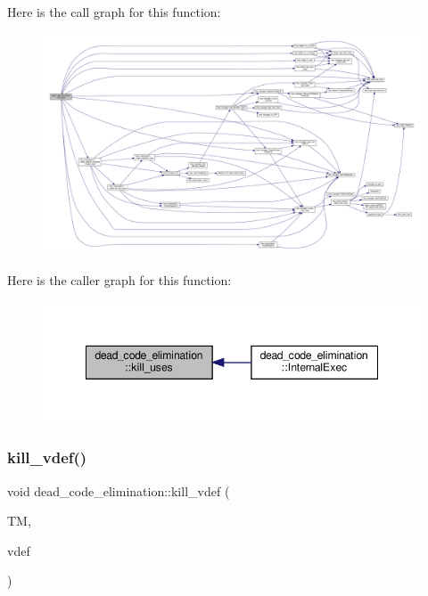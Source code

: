 Here is the call graph for this function\+:
\nopagebreak
\begin{figure}[H]
\begin{center}
\leavevmode
\includegraphics[width=350pt]{d5/d8b/classdead__code__elimination_af489c33b5908e6b2a9cb967022ee37da_cgraph}
\end{center}
\end{figure}
Here is the caller graph for this function\+:
\nopagebreak
\begin{figure}[H]
\begin{center}
\leavevmode
\includegraphics[width=348pt]{d5/d8b/classdead__code__elimination_af489c33b5908e6b2a9cb967022ee37da_icgraph}
\end{center}
\end{figure}
\mbox{\label{classdead__code__elimination_acf7b0a14bfd3b75d84f97fbb303736df}} 
\subsubsection{\texorpdfstring{kill\+\_\+vdef()}{kill\_vdef()}}
{\footnotesize\ttfamily void dead\+\_\+code\+\_\+elimination\+::kill\+\_\+vdef (\begin{DoxyParamCaption}\item[{const \hyperlink{tree__manager_8hpp_a96ff150c071ce11a9a7a1e40590f205e}{tree\+\_\+manager\+Ref}}]{TM,  }\item[{\hyperlink{tree__node_8hpp_a6ee377554d1c4871ad66a337eaa67fd5}{tree\+\_\+node\+Ref}}]{vdef }\end{DoxyParamCaption})\hspace{0.3cm}{\ttfamily [private]}}



